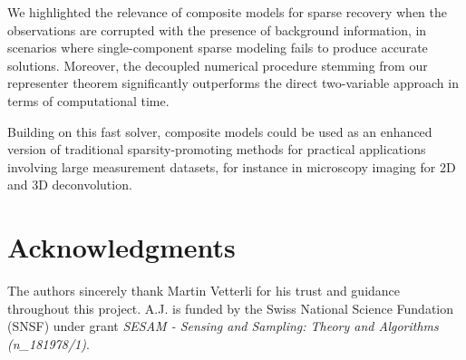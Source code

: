\documentclass[12pt]{article}
\begin{document}
    We highlighted the relevance of composite models for sparse recovery when the observations are corrupted with the presence of background information, in scenarios where single-component sparse modeling fails to produce accurate solutions. Moreover, the decoupled numerical procedure stemming from our representer theorem significantly outperforms the direct two-variable approach in terms of computational time.

    Building on this fast solver, composite models could be used as an enhanced version of traditional sparsity-promoting methods for practical applications involving large measurement datasets, for instance in microscopy imaging for 2D and 3D deconvolution.

\section*{Acknowledgments}
    The authors sincerely thank Martin Vetterli for his trust and guidance throughout this project. 
    A.J. is funded by the Swiss National Science Fundation (SNSF) under grant \emph{SESAM - Sensing and Sampling: Theory and Algorithms (n\_181978/1)}.
    




\end{document}
